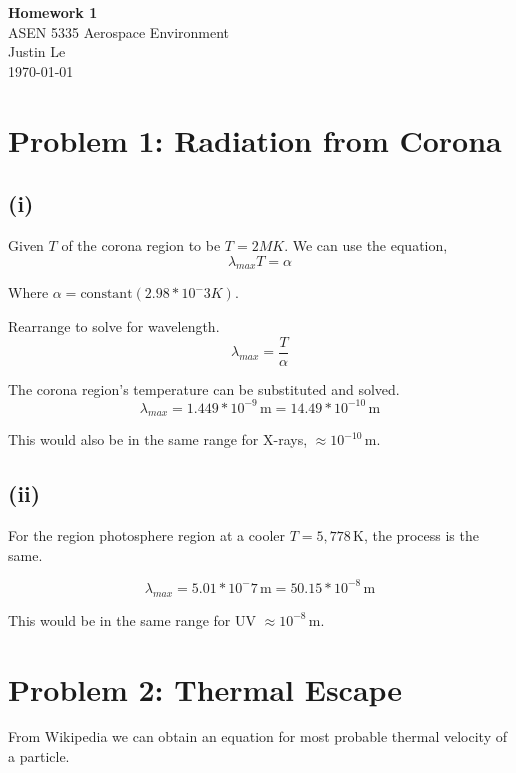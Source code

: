 \documentclass[11pt]{article}
\begin{document}
\begin{center}
    {\Large \textbf{Homework 1}}\\[0.5em]
    {\large ASEN 5335 Aerospace Environment}\\[0.5em]
    Justin Le\\ 
    \today
    \\[0.5em]
\end{center}

\vspace{1em}

\section*{Problem 1: Radiation from Corona}

\subsection*{(i)}

Given $T$ of the corona region to be $T=2MK$. We can use the equation,
\[
\lambda_{max}T = \alpha
\]

Where $\alpha = \text{constant}(2.98*10^-3 K)$.

Rearrange to solve for wavelength.
\[
\lambda_{max} = \frac{T}{\alpha}
\]

The corona region's temperature can be substituted and solved.
\[
\boxed{\lambda_{max}  = 1.449*10^{-9} \, \mathrm{m} = 14.49*10^{-10} \, \mathrm{m}}
\]

This would also be in the same range for X-rays, $\approx 10^{-10} \, \mathrm{m}$.

\subsection*{(ii)}
For the region photosphere region at a cooler $T=5,778 \, \mathrm{K}$,
the process is the same.

\[
\boxed{\lambda_{max}  = 5.01*10^-7 \, \mathrm{m} = 50.15*10^{-8} \, \mathrm{m}}
\]

This would be in the same range for UV $\approx 10^{-8} \, \mathrm{m}$.

\section*{Problem 2: Thermal Escape}

From Wikipedia we can obtain an equation for most probable thermal velocity
of a particle.
\end{document}
